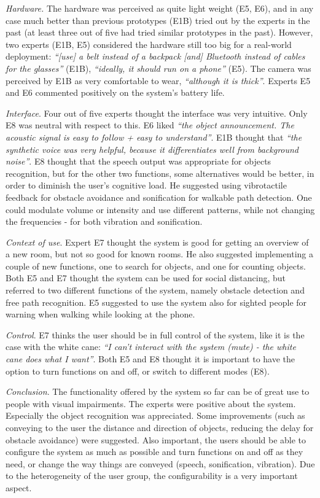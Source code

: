 \documentclass[journal]{IEEEtran}
\begin{document}
\emph{Hardware.} 
The hardware was perceived as quite light weight (E5, E6), and in any case much better than previous prototypes (E1B) tried out by the experts in the past (at least three out of five had tried similar prototypes in the past). However, two experts (E1B, E5) considered the hardware still too big for a real-world deployment: \emph{``[use] a belt instead of a backpack [and] Bluetooth instead of cables for the glasses''}  (E1B), \emph{``ideally, it should run on a phone''} (E5).
The camera was perceived by E1B as very comfortable to wear, \emph{``although it is thick''}.
Experts E5 and E6 commented positively on the system's battery life.

\emph{Interface}. Four out of five experts thought the interface was very intuitive. Only E8 was neutral with respect to this. E6 liked \emph{``the object announcement. The acoustic signal is easy to follow + easy to understand''}. E1B thought that \emph{``the synthetic voice was very helpful, because it differentiates well from background noise''}. E8 thought that the speech output was appropriate for objects recognition, but for the other two functions, some alternatives would be better, in order to diminish the user's cognitive load.
He suggested using vibrotactile feedback for obstacle avoidance and sonification for walkable path detection. One could modulate volume or intensity and use different patterns, while not changing the frequencies - for both vibration and sonification.

\emph{Context of use}. Expert E7 thought the system is good for getting an overview of a new room, but not so good for known rooms. He also suggested implementing a couple of new functions, one to search for objects,
and one for counting objects.
Both E5 and E7 thought the system can be used for social distancing, but referred to two different functions of the system, namely obstacle detection and free path recognition.
E5 suggested to use the system also for sighted people for warning when walking while looking at the phone. 

\emph{Control}. E7 thinks the user should be in full control of the system, like it is the case with the white cane: \emph{``I can't interact with the system (mute) - the white cane does what I want''}. Both E5 and E8 thought it is important to have the option to turn functions on and off, or switch to different modes (E8).

\emph{Conclusion}. The functionality offered by the system so far can be of great use to people with visual impairments. The experts were positive about the system. Especially the object recognition was appreciated. Some improvements (such as conveying to the user the distance and direction of objects, reducing the delay for obstacle avoidance) were suggested. Also important, the users should be able to configure the system as much as possible and turn functions on and off as they need, or change the way things are conveyed (speech, sonification, vibration). Due to the heterogeneity of the user group, the configurability is a very important aspect. 
\end{document}
